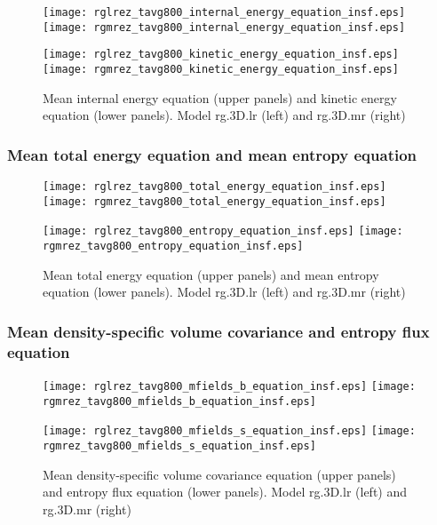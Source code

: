 \documentclass[10pt,paper=a4]{report}
\begin{document}
\begin{figure}[!h]
\centerline{
\texttt{[image: rglrez\_tavg800\_internal\_energy\_equation\_insf.eps]}
\texttt{[image: rgmrez\_tavg800\_internal\_energy\_equation\_insf.eps]}}

\centerline{
\texttt{[image: rglrez\_tavg800\_kinetic\_energy\_equation\_insf.eps]}
\texttt{[image: rgmrez\_tavg800\_kinetic\_energy\_equation\_insf.eps]}}
\caption{Mean internal energy equation (upper panels) and kinetic energy equation (lower panels). Model {\sf rg.3D.lr} (left) and {\sf rg.3D.mr} (right) \label{fig:rg-res-ei-ek-equation}}
\end{figure}

\newpage

\subsubsection{Mean total energy equation and mean entropy equation}

\begin{figure}[!h]
\centerline{
\texttt{[image: rglrez\_tavg800\_total\_energy\_equation\_insf.eps]}
\texttt{[image: rgmrez\_tavg800\_total\_energy\_equation\_insf.eps]}}

\centerline{
\texttt{[image: rglrez\_tavg800\_entropy\_equation\_insf.eps]}
\texttt{[image: rgmrez\_tavg800\_entropy\_equation\_insf.eps]}}
\caption{Mean total energy equation (upper panels) and mean entropy equation (lower panels). Model {\sf rg.3D.lr} (left) and {\sf rg.3D.mr} (right) \label{fig:rg-res-et-ss-equation}}
\end{figure}

\newpage

\subsubsection{Mean density-specific volume covariance and entropy flux equation}

\begin{figure}[!h]
\centerline{
\texttt{[image: rglrez\_tavg800\_mfields\_b\_equation\_insf.eps]}
\texttt{[image: rgmrez\_tavg800\_mfields\_b\_equation\_insf.eps]}}

\centerline{
\texttt{[image: rglrez\_tavg800\_mfields\_s\_equation\_insf.eps]}
\texttt{[image: rgmrez\_tavg800\_mfields\_s\_equation\_insf.eps]}}
\caption{Mean density-specific volume covariance equation (upper panels) and entropy flux equation (lower panels). Model {\sf rg.3D.lr} (left) and {\sf rg.3D.mr} (right) \label{fig:rg-res-ss-fssx-equation}}
\end{figure}
\end{document}
